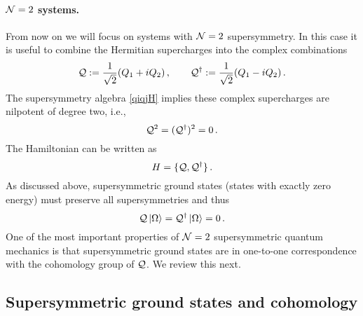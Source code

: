 \documentclass[11pt]{article}
\numberwithin{equation}{section}
\def\cN{{\cal N}}
\def\cQ{{\cal Q}}
\newcommand\equ[1] {\begin{equation}#1\end{equation}}
\renewcommand\( {\left(}
\renewcommand\) {\right)}
\begin{document}
\paragraph{$\cN=2$ systems. } From now on we will focus on systems with $\cN=2$ supersymmetry. In this case it is useful to combine the Hermitian supercharges into the complex combinations 
\equ{
\cQ:= \frac{1}{\sqrt 2} (Q_1+ i Q_2)\,,\qquad \cQ^\dagger:=\frac{1}{\sqrt 2} (Q_1- i Q_2)\,.
}
The supersymmetry algebra \eqref{qiqjH} implies these complex supercharges are nilpotent of degree two, i.e., 
\equ{\label{nilpQ}
\cQ^{2}=(\cQ^{\dagger})^{2}=0\,.
}
The Hamiltonian can be written as
\equ{\label{QQcom}
H=\{\cQ,\cQ^\dagger\}\,.
}
As discussed above, supersymmetric ground states (states with exactly zero energy) must preserve all supersymmetries and thus
\equ{\label{SUSYgs}
\cQ\ket{\Omega}=\cQ^\dagger\ket{\Omega}=0\,.
} 
One of the most important properties of $\cN=2$ supersymmetric quantum mechanics is that supersymmetric ground states are in one-to-one correspondence with the cohomology group of $\cQ$. We review this next.  


\subsection{Supersymmetric ground states and cohomology}
\label{sec:Cohomology, homology, and ground states}
\end{document}
